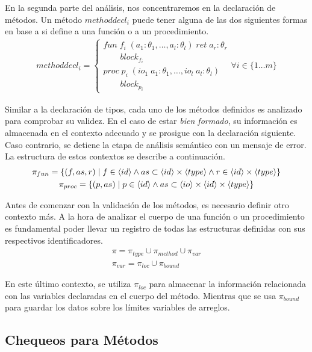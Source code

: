 \documentclass{article}
\begin{document}
En la segunda parte del análisis, nos concentraremos en la declaración de métodos.
Un método $methoddecl_i$ puede tener alguna de las dos siguientes formas en base a si define a una función o a un procedimiento.
\begin{gather*}
methoddecl_i =
\begin{cases*}
fun \; f_i \; (a_1: \theta_1, \ldots, a_l: \theta_l) \; ret \; a_r: \theta_r
\\
\qquad block_{f_i}
\\
proc \; p_i \; (io_1 \; a_1: \theta_1, \ldots, io_l \; a_l: \theta_l)
\\
\qquad block_{p_i}
\end{cases*}
\forall i \in \{ 1 \ldots m \}
\end{gather*}

Similar a la declaración de tipos, cada uno de los métodos definidos es analizado para comprobar su validez.
En el caso de estar \textit{bien formado}, su información es almacenada en el contexto adecuado y se prosigue con la declaración siguiente.
Caso contrario, se detiene la etapa de análisis semántico con un mensaje de error.
La estructura de estos contextos se describe a continuación.
\begin{gather*}
\pi_{fun} =
\{
(f, as, r) \mid
f \in \langle id \rangle
\wedge
as \subset \langle id \rangle \times \langle type \rangle
\wedge
r \in \langle id \rangle \times \langle type \rangle
\}
\\
\pi_{proc} =
\{
(p, as) \mid
p \in \langle id \rangle
\wedge
as \subset \langle io \rangle \times \langle id \rangle \times \langle type \rangle
\}
\end{gather*}

Antes de comenzar con la validación de los métodos, es necesario definir otro contexto más.
A la hora de analizar el cuerpo de una función o un procedimiento es fundamental poder llevar un registro de todas las estructuras definidas con sus respectivos identificadores.
\begin{gather*}
\pi = \pi_{type} \cup \pi_{method} \cup \pi_{var}
\\
\pi_{var} = \pi_{loc} \cup \pi_{bound}
\end{gather*}

En este último contexto, se utiliza $\pi_{loc}$ para almacenar la información relacionada con las variables declaradas en el cuerpo del método.
Mientras que se usa $\pi_{bound}$ para guardar los datos sobre los límites variables de arreglos.

\subsection{Chequeos para Métodos}
\end{document}

